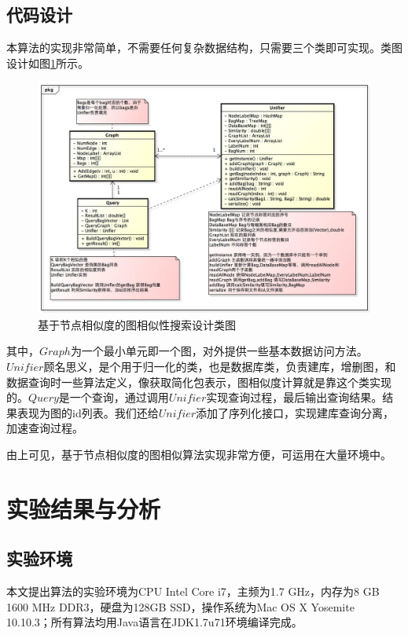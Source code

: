 \documentclass{XDBAthesis}
\begin{document}
\subsection{代码设计}
本算法的实现非常简单，不需要任何复杂数据结构，只需要三个类即可实现。类图设计如图\ref{fg:ghashdesign}所示。
\begin{figure}
    \includegraphics[width=\textwidth ]{../figures/G-Hash-pkg}
    \caption{基于节点相似度的图相似性搜索设计类图}
    \label{fg:ghashdesign}
\end{figure}

其中，$Graph$为一个最小单元即一个图，对外提供一些基本数据访问方法。$Unifier$顾名思义，是个用于归一化的类，也是数据库类，负责建库，增删图，和数据查询时一些算法定义，像获取简化包表示，图相似度计算就是靠这个类实现的。$Query$是一个查询，通过调用$Unifier$实现查询过程，最后输出查询结果。结果表现为图的id列表。我们还给$Unifier$添加了序列化接口，实现建库查询分离，加速查询过程。

由上可见，基于节点相似度的图相似算法实现非常方便，可运用在大量环境中。


\section{实验结果与分析}
\subsection{实验环境}
本文提出算法的实验环境为CPU Intel Core i7，主频为1.7 GHz，内存为8 GB 1600 MHz DDR3，硬盘为128GB SSD，操作系统为Mac OS X Yosemite 10.10.3；所有算法均用Java语言在JDK1.7u71环境编译完成。
\end{document}
